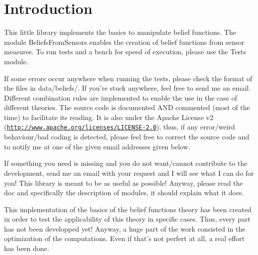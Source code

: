 \hypertarget{index_intro_sec}{}\section{Introduction}\label{index_intro_sec}
This little library implements the basics to manipulate belief functions. The module BeliefsFromSensors enables the creation of belief functions from sensor measures. To run tests and a bench for speed of execution, please use the Tests module.

If some errors occur anywhere when running the tests, please check the format of the files in data/beliefs/. If you're stuck anywhere, feel free to send me an email. Different combination rules are implemented to enable the use in the case of different theories. The source code is documented AND commented (most of the time) to facilitate its reading. It is also under the Apache License v2 (\href{http://www.apache.org/licenses/LICENSE-2.0}{\tt http://www.apache.org/licenses/LICENSE-\/2.0}), thus, if any error/weird behaviour/bad coding is detected, please feel free to correct the source code and to notify me at one of the given email addresses given below. \par


If something you need is missing and you do not want/cannot contribute to the development, send me an email with your request and I will see what I can do for you! This library is meant to be as useful as possible! Anyway, please read the doc and specifically the description of modules, it should explain what it does.

This implementation of the basics of the belief functions theory has been created in order to test the applicability of this theory in specific cases. Thus, every part has not been developped yet! Anyway, a huge part of the work consisted in the optimization of the computations. Even if that's not perfert at all, a real effort has been done.


